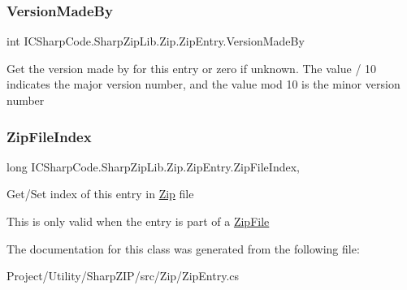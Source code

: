 \subsubsection{\texorpdfstring{Version\+Made\+By}{VersionMadeBy}}
{\footnotesize\ttfamily int I\+C\+Sharp\+Code.\+Sharp\+Zip\+Lib.\+Zip.\+Zip\+Entry.\+Version\+Made\+By\hspace{0.3cm}{\ttfamily [get]}}



Get the version made by for this entry or zero if unknown. The value / 10 indicates the major version number, and the value mod 10 is the minor version number 

\mbox{\label{class_i_c_sharp_code_1_1_sharp_zip_lib_1_1_zip_1_1_zip_entry_ae64189a6a1f6123adcb3a73ed94e2305}} 
\subsubsection{\texorpdfstring{Zip\+File\+Index}{ZipFileIndex}}
{\footnotesize\ttfamily long I\+C\+Sharp\+Code.\+Sharp\+Zip\+Lib.\+Zip.\+Zip\+Entry.\+Zip\+File\+Index\hspace{0.3cm}{\ttfamily [get]}, {\ttfamily [set]}}



Get/\+Set index of this entry in \hyperlink{namespace_i_c_sharp_code_1_1_sharp_zip_lib_1_1_zip}{Zip} file 

This is only valid when the entry is part of a \hyperlink{class_i_c_sharp_code_1_1_sharp_zip_lib_1_1_zip_1_1_zip_file}{Zip\+File}

The documentation for this class was generated from the following file\+:\begin{DoxyCompactItemize}
\item 
Project/\+Utility/\+Sharp\+Z\+I\+P/src/\+Zip/Zip\+Entry.\+cs\end{DoxyCompactItemize}
